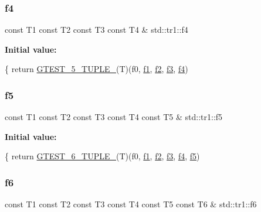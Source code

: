 \subsubsection{\texorpdfstring{f4}{f4}}
{\footnotesize\ttfamily const T1 const T2 const T3 const T4 \& std\+::tr1\+::f4}

{\bfseries Initial value\+:}
\begin{DoxyCode}
\{
  \textcolor{keywordflow}{return} \hyperlink{gtest-tuple_8h_a64e6f4a4cf55f62cde94066c6d5d5c74}{GTEST\_5\_TUPLE\_}(T)(f0, \hyperlink{namespacestd_1_1tr1_a9c0fa65b105f8e2f58ba59ecf75fd000}{f1}, \hyperlink{namespacestd_1_1tr1_a87dd9e009868361317f587126dba63d4}{f2}, \hyperlink{namespacestd_1_1tr1_a0f7c3b47d27d42d82d1a333ea420ce4e}{f3}, \hyperlink{namespacestd_1_1tr1_adc796e02b7385d526aff708189564f67}{f4})
\end{DoxyCode}
\mbox{\label{namespacestd_1_1tr1_a9c1eb66b2b2fa321942af95405232a0d}} 
\subsubsection{\texorpdfstring{f5}{f5}}
{\footnotesize\ttfamily const T1 const T2 const T3 const T4 const T5 \& std\+::tr1\+::f5}

{\bfseries Initial value\+:}
\begin{DoxyCode}
\{
  \textcolor{keywordflow}{return} \hyperlink{gtest-tuple_8h_a53f36c86a979ed8285bf3c6f82f16483}{GTEST\_6\_TUPLE\_}(T)(f0, \hyperlink{namespacestd_1_1tr1_a9c0fa65b105f8e2f58ba59ecf75fd000}{f1}, \hyperlink{namespacestd_1_1tr1_a87dd9e009868361317f587126dba63d4}{f2}, \hyperlink{namespacestd_1_1tr1_a0f7c3b47d27d42d82d1a333ea420ce4e}{f3}, \hyperlink{namespacestd_1_1tr1_adc796e02b7385d526aff708189564f67}{f4}, \hyperlink{namespacestd_1_1tr1_a9c1eb66b2b2fa321942af95405232a0d}{f5})
\end{DoxyCode}
\mbox{\label{namespacestd_1_1tr1_a6b62f32e1e3e21bceb94eb46c4cbfd56}} 
\subsubsection{\texorpdfstring{f6}{f6}}
{\footnotesize\ttfamily const T1 const T2 const T3 const T4 const T5 const T6 \& std\+::tr1\+::f6}

